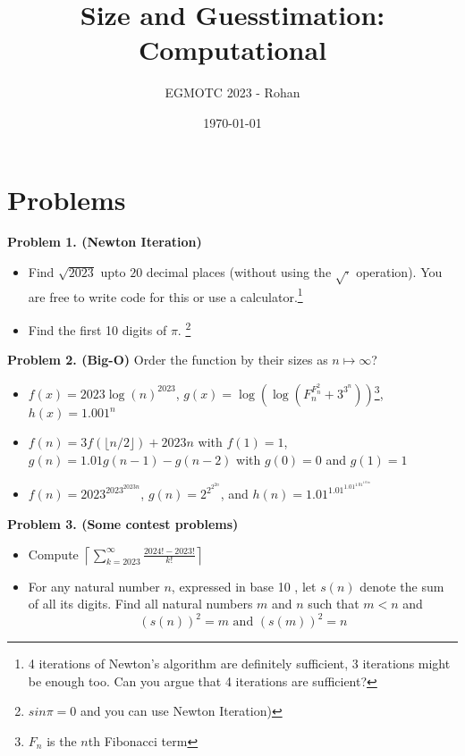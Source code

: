 \documentclass[12pt]{article}
\title{Size and Guesstimation: Computational}
\author{EGMOTC 2023 - Rohan}
\date{\today}
\begin{document}
\maketitle

\newcommand{\localtextbulletone}{\textcolor{black}{\raisebox{.45ex}{\rule{.6ex}{.6ex}}}}
\renewcommand{\labelitemi}{\localtextbulletone}

\section*{Problems}
\vspace{1cm}
\thispagestyle{empty}


\textbf{Problem 1. (Newton Iteration)} 
\begin{itemize}
    \item Find $\sqrt{2023}$ upto $20$ decimal places (without using the $\sqrt{\cdot{}}$ operation). You are free to write code for this or use a calculator.\footnote{4 iterations of Newton's algorithm are definitely sufficient, 3 iterations might be enough too. Can you argue that 4 iterations are sufficient?}
    \item Find the first 10 digits of $\pi$. \footnote{$sin \pi=0$ and you can use Newton Iteration)}
\end{itemize}

\textbf{Problem 2. (Big-O)} Order the function by their sizes as $n\mapsto \infty$?
\begin{itemize}
    \item $f(x)=2023\log(n)^{2023}$, $g(x)=\log(\log(F_n^{F_n^2}+3^{3^n}))$\footnote{$F_n$ is the $n$th Fibonacci term}, $h(x)=1.001^n$
    \item $f(n)=3f\left(\lfloor{} n/2\rfloor{}\right)+2023n$ with $f(1)=1$, $g(n)=1.01g(n-1)-g(n-2)$ with $g(0)=0$ and $g(1)=1$
    \item $f(n)=2023^{2023^{2023n}}$, $g(n)=2^{2^{2^{2n}}}$, and $h(n)=1.01^{1.01^{1.01^{1.01^{1.01n}}}}$  
\end{itemize}  

\textbf{Problem 3. (Some contest problems)}
\begin{itemize}
    \item Compute $\left\lceil\displaystyle\sum_{k=2023}^{\infty}\frac{2024!-2023!}{k!}\right\rceil$
    \item For any natural number $n$, expressed in base 10 , let $s(n)$ denote the sum of all its digits. Find all natural numbers $m$ and $n$ such that $m<n$ and
    \[(s(n))^2=m \text { and }(s(m))^2=n\]
\end{itemize} 
\end{document}
